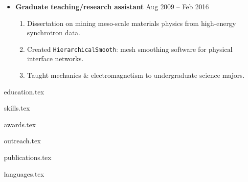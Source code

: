 \documentclass[10.5pt]{article}
\begin{document}
\begin{itemize}
    \item
        \textbf{Graduate teaching/research assistant}
        \hfill  {Aug 2009 -- Feb 2016} \par
        \begin{enumerate}
            \item Dissertation on mining meso-scale materials physics from high-energy synchrotron data.
            \item Created \texttt{HierarchicalSmooth}: mesh smoothing software for physical interface networks. 
            \item Taught mechanics \& electromagnetism to undergraduate science majors.
        \end{enumerate}
\end{itemize} 

{education.tex}

{skills.tex}

{awards.tex}

{outreach.tex}

{publications.tex}

{languages.tex}
\end{document}
